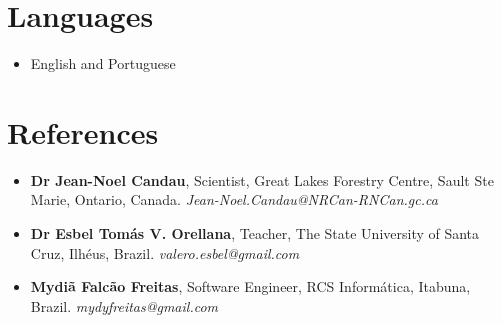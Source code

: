 \documentclass[10pt, a4paper, oneside, final]{scrartcl} %
\begin{document}

\section{Languages}

\begin{itemize} \itemsep1.5pt \parskip0pt 
  \item English and Portuguese 
\end{itemize}


\section{References}

\begin{itemize} \itemsep2pt \parskip0pt 
\item \textbf{Dr Jean-Noel Candau}, Scientist, Great Lakes Forestry Centre, Sault Ste Marie, Ontario, Canada. \textit{Jean-Noel.Candau@NRCan-RNCan.gc.ca}

\item \textbf{Dr Esbel Tomás V. Orellana}, Teacher, The State University of Santa Cruz, Ilhéus, Brazil. \textit{valero.esbel@gmail.com} 

\item \textbf{Mydiã Falcão Freitas}, Software Engineer, RCS Informática, Itabuna, Brazil. \textit{mydyfreitas@gmail.com} 
\end{itemize}

\end{document}
